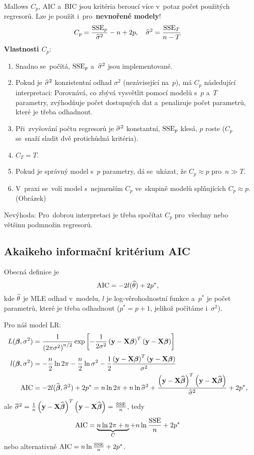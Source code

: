 Mallows $C_p$, AIC a~BIC jsou kritéria beroucí více v~potaz počet použitých regresorů. Lze je použít i~pro~\textbf{nevnořené modely}!
 $$
C_p = \frac{\mathrm{SSE}_p}{\widehat{\sigma}^2} - n + 2p, \quad \widehat{\sigma}^2 = \frac{\mathrm{SSE}_T}{n-T}
 $$
\textbf{Vlastnosti $C_p$}:
\begin{enumerate}[1)]
\item Snadno se~počítá, $\mathrm{SSE}_p$ a~$\widehat{\sigma}^2$ jsou implementované.
\item Pokud je $\widehat{\sigma}^2$ konzistentní odhad $\sigma^2$ (nezávisející na~$p$), má $C_p$ následující interpretaci: Porovnává, co zbývá vysvětlit pomocí modelů s~$p$ a~$T$ parametry, zvýhodňuje počet dostupných dat a~penalizuje počet parametrů, které je třeba odhadnout.
\item Při~zvyšování počtu regresorů je $\widehat{\sigma}^2$ konstantní, $\mathrm{SSE}_p$ klesá, $p$ roste ($C_p$ se~snaží sladit dvě protichůdná kritéria).
\item $C_T = T$.
\item Pokud je správný model s~$p$ parametry, dá se~ukázat, že $C_p \approx p$ pro~$n \gg T$.
\item V~praxi se~volí model s~nejmenším $C_p$ ve~skupině modelů splňujících $C_p \approx p$. (Obrázek)
\end{enumerate}

\begin{remark}
Nevýhoda: Pro~dobrou interpretaci je třeba spočítat $C_p$ pro~všechny nebo většinu podmnožin regresorů.
\end{remark}

\subsection{Akaikeho informační kritérium AIC}

Obecná definice je
 $$
\mathrm{AIC} = -2l(\widehat{\theta}) + 2p^*,
 $$
kde $\widehat{\theta}$ je MLE odhad v~modelu, $l$ je log-věrohodnostní funkce a~$p^*$ je počet parametrů, které je třeba odhadnout ($p^* = p + 1$, jelikož počítáme i~$\sigma^2$).

Pro náš model LR:
\begin{align*}
L(\boldsymbol{\beta},\sigma^2) & = \frac{1}{\left(2\pi \sigma^2\right)^{n/2}} \exp \left[- \frac{1}{2\sigma^2} \left(\mathbf{y} - \mathbf{X} \boldsymbol{\beta} \right)^T \left(\mathbf{y} - \mathbf{X} \boldsymbol{\beta} \right) \right] \\
l(\boldsymbol{\beta}, \sigma^2) & = - \frac{n}{2} \ln 2\pi - \frac{n}{2} \ln \sigma^2 - \frac{1}{2} \frac{\left(\mathbf{y} - \mathbf{X} \boldsymbol{\beta} \right)^T \left(\mathbf{y} - \mathbf{X} \boldsymbol{\beta} \right)}{\sigma^2} \\
\mathrm{AIC} & = -2l(\widehat{\boldsymbol{\beta}}, \widehat{\sigma}^2) + 2p^* = n \ln 2\pi + n\ln \widehat{\sigma}^2 + \frac{\left(\mathbf{y} - \mathbf{X} \widehat{\boldsymbol{\beta}} \right)^T \left(\mathbf{y} - \mathbf{X} \widehat{\boldsymbol{\beta}} \right)}{\widehat{\sigma}^2} + 2p^*,
\end{align*}
ale $\widehat{\sigma}^2 = \frac{1}{n} \left(\mathbf{y} - \mathbf{X} \widehat{\boldsymbol{\beta}} \right)^T \left(\mathbf{y} - \mathbf{X} \widehat{\boldsymbol{\beta}} \right) = \frac{\mathrm{SSE}}{n}$, tedy
 $$
\mathrm{AIC} = \underbrace{n \ln 2 \pi + n}_C + n \ln \frac{\mathrm{SSE}}{n} + 2p^*
 $$
nebo alternativně $\mathrm{AIC} = n \ln \frac{\mathrm{SSE}}{n} + 2p^*$.

